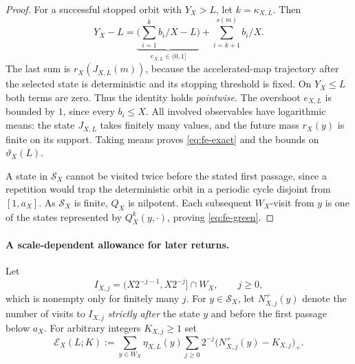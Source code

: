 \begin{proof}
For a successful stopped orbit with $Y_X>L$, let $k=\kappa_{X,L}$.
Then
\[
 Y_X-L
 =\underbrace{\Big(\sum_{i=1}^{k}b_i/X-L\Big)}_{e_{X,L}\in(0,1]}
  +\sum_{i=k+1}^{s(m)}b_i/X.
\]
The last sum is $r_X(J_{X,L}(m))$, because the accelerated-map
trajectory after the selected state is deterministic and its stopping
threshold is fixed.  On $Y_X\le L$ both terms are zero.  Thus the
identity holds \emph{pointwise}. The overshoot $e_{X,L}$ is bounded
by $1$, since every $b_i\le X$.  All involved observables have
logarithmic means: the state $J_{X,L}$ takes finitely many values,
and the future mass $r_X(y)$ is finite on its support.  Taking means
proves \eqref{eq:fe-exact} and the bounds on $\vartheta_X(L)$.

A state in $\mathcal S_X$ cannot be visited twice before the stated
first passage, since a repetition would trap the deterministic orbit
in a periodic cycle disjoint from $[1,a_X]$.  As $\mathcal S_X$ is
finite, $Q_X$ is nilpotent.  Each subsequent $W_X$-visit from $y$
is one of the states represented by $Q_X^k(y,\cdot)$, proving
\eqref{eq:fe-green}.
\end{proof}

\paragraph{A scale-dependent allowance for later returns.}
Let
\[
 I_{X,j}=(X2^{-j-1},X2^{-j}]\cap W_X,\qquad j\ge0,
\]
which is nonempty only for finitely many $j$. For $y\in\mathcal S_X$,
let $N^+_{X,j}(y)$ denote the number of visits to $I_{X,j}$
\emph{strictly after} the state $y$ and before the first passage
below $a_X$.  For arbitrary integers $K_{X,j}\ge1$ set
\begin{equation}\label{eq:fe-excess-return}
 \mathcal E_X(L;K):=
  \sum_{y\in W_X}\eta_{X,L}(y)
       \sum_{j\ge0}2^{-j}\bigl(N^+_{X,j}(y)-K_{X,j}\bigr)_+.
\end{equation}

